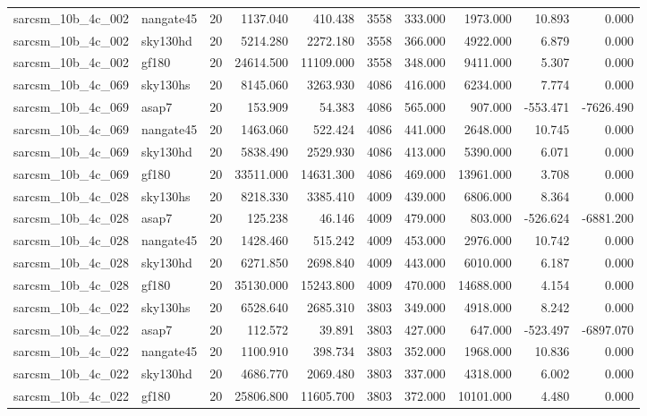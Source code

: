 \begin{tabular}{llrrrrrrrr}
sarcsm\_10b\_4c\_002 & nangate45 & 20 & 1137.040 & 410.438 & 3558 & 333.000 & 1973.000 & 10.893 & 0.000 \\
sarcsm\_10b\_4c\_002 & sky130hd & 20 & 5214.280 & 2272.180 & 3558 & 366.000 & 4922.000 & 6.879 & 0.000 \\
sarcsm\_10b\_4c\_002 & gf180 & 20 & 24614.500 & 11109.000 & 3558 & 348.000 & 9411.000 & 5.307 & 0.000 \\
sarcsm\_10b\_4c\_069 & sky130hs & 20 & 8145.060 & 3263.930 & 4086 & 416.000 & 6234.000 & 7.774 & 0.000 \\
sarcsm\_10b\_4c\_069 & asap7 & 20 & 153.909 & 54.383 & 4086 & 565.000 & 907.000 & -553.471 & -7626.490 \\
sarcsm\_10b\_4c\_069 & nangate45 & 20 & 1463.060 & 522.424 & 4086 & 441.000 & 2648.000 & 10.745 & 0.000 \\
sarcsm\_10b\_4c\_069 & sky130hd & 20 & 5838.490 & 2529.930 & 4086 & 413.000 & 5390.000 & 6.071 & 0.000 \\
sarcsm\_10b\_4c\_069 & gf180 & 20 & 33511.000 & 14631.300 & 4086 & 469.000 & 13961.000 & 3.708 & 0.000 \\
sarcsm\_10b\_4c\_028 & sky130hs & 20 & 8218.330 & 3385.410 & 4009 & 439.000 & 6806.000 & 8.364 & 0.000 \\
sarcsm\_10b\_4c\_028 & asap7 & 20 & 125.238 & 46.146 & 4009 & 479.000 & 803.000 & -526.624 & -6881.200 \\
sarcsm\_10b\_4c\_028 & nangate45 & 20 & 1428.460 & 515.242 & 4009 & 453.000 & 2976.000 & 10.742 & 0.000 \\
sarcsm\_10b\_4c\_028 & sky130hd & 20 & 6271.850 & 2698.840 & 4009 & 443.000 & 6010.000 & 6.187 & 0.000 \\
sarcsm\_10b\_4c\_028 & gf180 & 20 & 35130.000 & 15243.800 & 4009 & 470.000 & 14688.000 & 4.154 & 0.000 \\
sarcsm\_10b\_4c\_022 & sky130hs & 20 & 6528.640 & 2685.310 & 3803 & 349.000 & 4918.000 & 8.242 & 0.000 \\
sarcsm\_10b\_4c\_022 & asap7 & 20 & 112.572 & 39.891 & 3803 & 427.000 & 647.000 & -523.497 & -6897.070 \\
sarcsm\_10b\_4c\_022 & nangate45 & 20 & 1100.910 & 398.734 & 3803 & 352.000 & 1968.000 & 10.836 & 0.000 \\
sarcsm\_10b\_4c\_022 & sky130hd & 20 & 4686.770 & 2069.480 & 3803 & 337.000 & 4318.000 & 6.002 & 0.000 \\
sarcsm\_10b\_4c\_022 & gf180 & 20 & 25806.800 & 11605.700 & 3803 & 372.000 & 10101.000 & 4.480 & 0.000 \\

\end{tabular}
